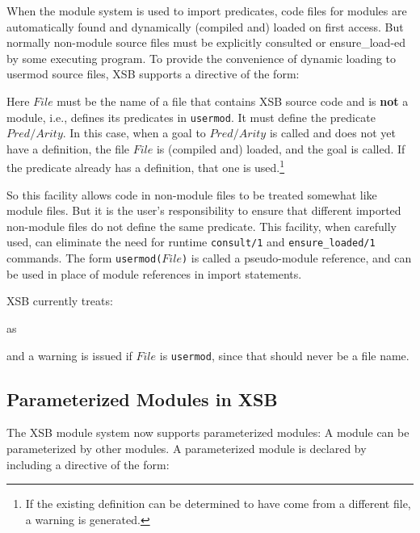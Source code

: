 When the module system is used to import predicates, code files for
modules are automatically found and dynamically (compiled and) loaded
on first access.  But normally non-module source files must be
explicitly consulted or ensure\_load-ed by some executing program.  To
provide the convenience of dynamic loading to usermod source files,
XSB supports a directive of the form:


\noindent Here $File$ must be the name of a file that contains XSB
source code and is {\bf not} a module, i.e., defines its predicates in
{\tt usermod}.  It must define the predicate $Pred/Arity$.  In this
case, when a goal to $Pred/Arity$ is called and does not yet have a
definition, the file $File$ is (compiled and) loaded, and the goal is
called.  If the predicate already has a definition, that one is
used.\footnote{If the existing definition can be determined to have
  come from a different file, a warning is generated.}

So this facility allows code in non-module files to be treated
somewhat like module files.  But it is the user's responsibility to
ensure that different imported non-module files do not define the same
predicate.  This facility, when carefully used, can eliminate the need
for runtime {\tt consult/1} and {\tt ensure\_loaded/1} commands.  The
form {\tt usermod($File$)} is called a pseudo-module reference, and
can be used in place of module references in import statements.

XSB currently treats:


\noindent as

  
\noindent and a warning is issued if $File$ is {\tt usermod}, since
that should never be a file name.

\subsection{Parameterized Modules in XSB}

The XSB module system now supports parameterized modules: A module can
be parameterized by other modules.  A parameterized module is declared
by including a directive of the form:


